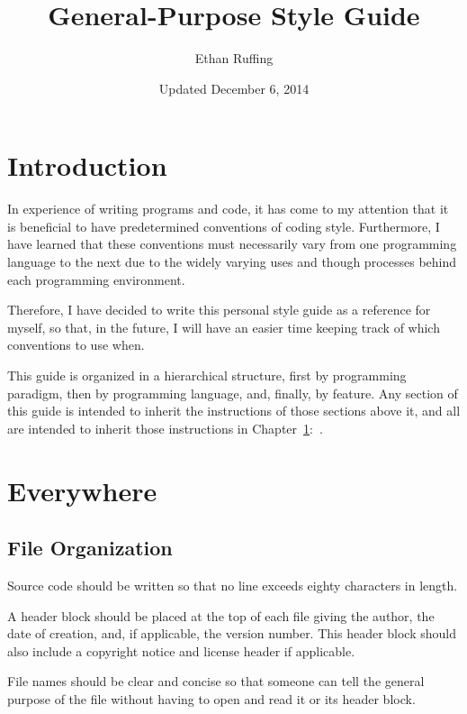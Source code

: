 \documentclass[12pt,letter]{memoir} %
\title{General-Purpose Style Guide}
\author{Ethan Ruffing}
\date{Updated December 6, 2014} %
\begin{document}
\maketitle
\thispagestyle{plainnotice}


\clearpage\mbox{}\thispagestyle{empty}\clearpage

\tableofcontents*

\newpage
\thispagestyle{empty}
\mbox{}

\chapter*{Introduction}
In experience of writing programs and code, it has come to my attention that it
is beneficial to have predetermined conventions of coding style. Furthermore, I
have learned that these conventions must necessarily vary from one programming
language to the next due to the widely varying uses and though processes behind
each programming environment.

Therefore, I have decided to write this personal style guide as a reference for
myself, so that, in the future, I will have an easier time keeping track of
which conventions to use when.

This guide is organized in a hierarchical structure, first by programming
paradigm, then by programming language, and, finally, by feature. Any section of
this guide is intended to inherit the instructions of those sections above it,
and all are intended to inherit those instructions in
Chapter~\ref{chap:everywhere}:~.

\chapter{Everywhere}\label{chap:everywhere}
	\section{File Organization}
		Source code should be written so that no line exceeds eighty characters
		in length.

		A header block should be placed at the top of each file giving the
		author, the date of creation, and, if applicable, the version number.
		This header block should also include a copyright notice and license
		header if applicable.

		File names should be clear and concise so that someone can tell the
		general purpose of the file without having to open and read it or its
		header block.
\end{document}
